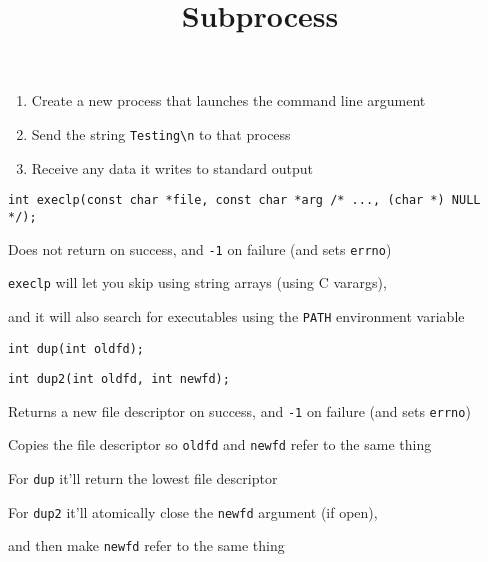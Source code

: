 

\title{Subprocess}


  \begin{frame}
    \titlepage
  \end{frame}

  \begin{slide}


    \begin{enumerate}
      \item Create a new process that launches the command line argument
      \item Send the string \texttt{Testing\textbackslash n} to that process
      \item Receive any data it writes to standard output
    \end{enumerate}

  \end{slide}

  \begin{slide}

    \begin{verbatim}
int execlp(const char *file, const char *arg /* ..., (char *) NULL */);
    \end{verbatim}
    \medskip

    Does not return on success, and \texttt{-1} on failure
    (and sets \texttt{errno})
    \medskip

    \texttt{execlp} will let you skip using string arrays (using C varargs),

    and it will also search for executables using the \texttt{PATH} environment
    variable
  \end{slide}

  \begin{slide}

    \texttt{int dup(int oldfd);}

    \texttt{int dup2(int oldfd, int newfd);}
    \medskip

    Returns a new file descriptor on success, and \texttt{-1} on failure
    (and sets \texttt{errno})
    \medskip

    Copies the file descriptor so \texttt{oldfd} and \texttt{newfd} refer to
    the same thing
    \medskip

    For \texttt{dup} it'll return the lowest file descriptor
    \medskip

    For \texttt{dup2} it'll atomically close the \texttt{newfd} argument
    (if open),

    and then make \texttt{newfd} refer to the same thing

  \end{slide}

